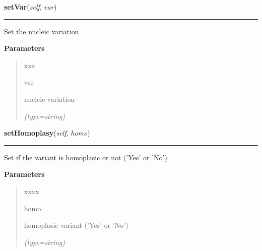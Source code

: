 \hspace{.8\funcindent}\begin{boxedminipage}{\funcwidth}

    \raggedright \textbf{setVar}(\textit{self}, \textit{var})

    \vspace{-1.5ex}

    \rule{\textwidth}{0.5\fboxrule}
\setlength{\parskip}{2ex}
    Set the nucleic variation

\setlength{\parskip}{1ex}
      \textbf{Parameters}
      \vspace{-1ex}

      \begin{quote}
        \begin{Ventry}{xxx}

          \item[var]

          nucleic variation

            {\it (type=string)}

        \end{Ventry}

      \end{quote}

    \end{boxedminipage}

    \label{script-FixedVar:var:setHomoplasy}

    \vspace{0.5ex}

\hspace{.8\funcindent}\begin{boxedminipage}{\funcwidth}

    \raggedright \textbf{setHomoplasy}(\textit{self}, \textit{homo})

    \vspace{-1.5ex}

    \rule{\textwidth}{0.5\fboxrule}
\setlength{\parskip}{2ex}
    Set if the variant is homoplasic or not ('Yes' or 'No')

\setlength{\parskip}{1ex}
      \textbf{Parameters}
      \vspace{-1ex}

      \begin{quote}
        \begin{Ventry}{xxxx}

          \item[homo]

          homoplasic variant ('Yes' or 'No')

            {\it (type=string)}

        \end{Ventry}

      \end{quote}

    \end{boxedminipage}

